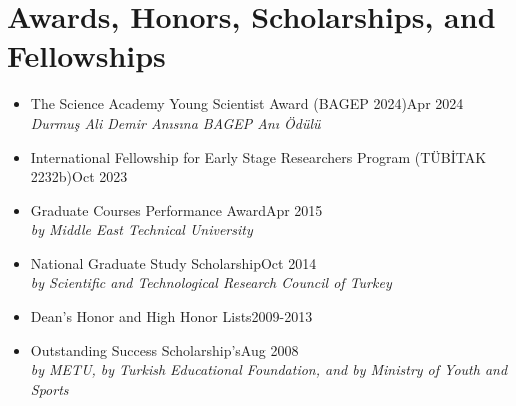 \documentclass[a4paper,11pt]{article}
\begin{document}
\section{\textcolor{burntorange}{Awards, Honors, Scholarships, and Fellowships}}
\begin{itemize}[itemsep=.001em] 
	\item[] The Science Academy Young Scientist Award (BAGEP 2024)\hfill Apr 2024\\
	\hspace*{1.8em}\emph{Durmuş Ali Demir Anısına BAGEP Anı Ödülü}
	\item[] International Fellowship for Early Stage Researchers Program (TÜBİTAK 2232b)\hfill Oct 2023
	\item[]  Graduate Courses Performance Award\hfill Apr 2015\\
\hspace*{1.8em}\emph{by Middle East Technical University}	
	\item[]  National Graduate Study Scholarship\hfill Oct 2014\\
	\hspace*{1.8em}\emph{by Scientific and Technological Research Council of Turkey}
	\item[] Dean’s Honor and High Honor Lists\hfill 2009-2013

	\item[] Outstanding Success Scholarship's\hfill Aug 2008\\
		\hspace*{1.8em}\emph{by METU, by Turkish Educational Foundation, and by Ministry of Youth and Sports}
\end{itemize}
\end{document}
